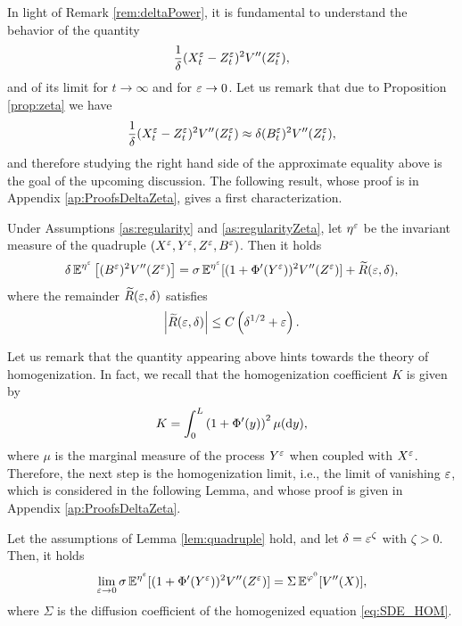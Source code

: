\documentclass[10pt]{article}
\begin{document}
In light of Remark \ref{rem:deltaPower}, it is fundamental to understand the behavior of the quantity
\begin{equation}
	\frac1\delta (X_t^\varepsilon - Z_t^\varepsilon)^2 V''(Z_t^\varepsilon),
\end{equation}
and of its limit for $t\to \infty$ and for $\varepsilon \to 0$. Let us remark that due to Proposition \ref{prop:zeta} we have
\begin{equation}
	\frac1\delta (X_t^\varepsilon - Z_t^\varepsilon)^2 V''(Z_t^\varepsilon) \approx \delta (B_t^\varepsilon)^2 V''(Z_t^\varepsilon),
\end{equation}
and therefore studying the right hand side of the approximate equality above is the goal of the upcoming discussion. The following result, whose proof is in Appendix \ref{ap:ProofsDeltaZeta}, gives a first characterization.

\begin{lemma} \label{lem:quadruple} Under Assumptions \ref{as:regularity} and \ref{as:regularityZeta}, let $\eta^\varepsilon$ be the invariant measure of the quadruple $(X^\varepsilon, Y^\varepsilon, Z^\varepsilon, B^\varepsilon)$. Then it holds
	\begin{equation}
	\delta \operatorname{\mathbb{E}}^{\eta^\varepsilon} \left[ (B^\varepsilon)^2 V''(Z^\varepsilon)  \right] = \sigma \operatorname{\mathbb{E}}^{\eta^\varepsilon} [(1 + \Phi'(Y^\varepsilon))^2V''(Z^\varepsilon) ] + \widetilde R(\varepsilon,\delta),
	\end{equation}
	where the remainder $\widetilde R(\varepsilon,\delta)$ satisfies
	\begin{equation} \label{eq:quadruple_remainder}
	\left| \widetilde R(\varepsilon,\delta) \right| \le C \left( \delta^{1/2} + \varepsilon \right).
	\end{equation}
\end{lemma}

Let us remark that the quantity appearing above hints towards the theory of homogenization. In fact, we recall that the homogenization coefficient $K$ is given by
\begin{equation}
	K = \int_0^L \left(1 + \Phi'(y)\right)^2 \mu(\mathrm{d} y),
\end{equation}
where $\mu$ is the marginal measure of the process $Y^\varepsilon$ when coupled with $X^\varepsilon$. Therefore, the next step is the homogenization limit, i.e., the limit of vanishing $\varepsilon$, which is considered in the following Lemma, and whose proof is given in Appendix \ref{ap:ProofsDeltaZeta}.

\begin{lemma} \label{lem:quadruple_convergence} Let the assumptions of Lemma \ref{lem:quadruple} hold, and let $\delta = \varepsilon^\zeta$ with $\zeta > 0$. Then, it holds
	\begin{equation}
	\lim_{\varepsilon \to 0} \sigma \operatorname{\mathbb{E}}^{\eta^\varepsilon} [(1 + \Phi'(Y^\varepsilon))^2V''(Z^\varepsilon) ] = \Sigma \operatorname{\mathbb{E}}^{\varphi^0} [V''(X)],
	\end{equation}
	where $\Sigma$ is the diffusion coefficient of the homogenized equation \eqref{eq:SDE_HOM}.
\end{lemma}
\end{document}
